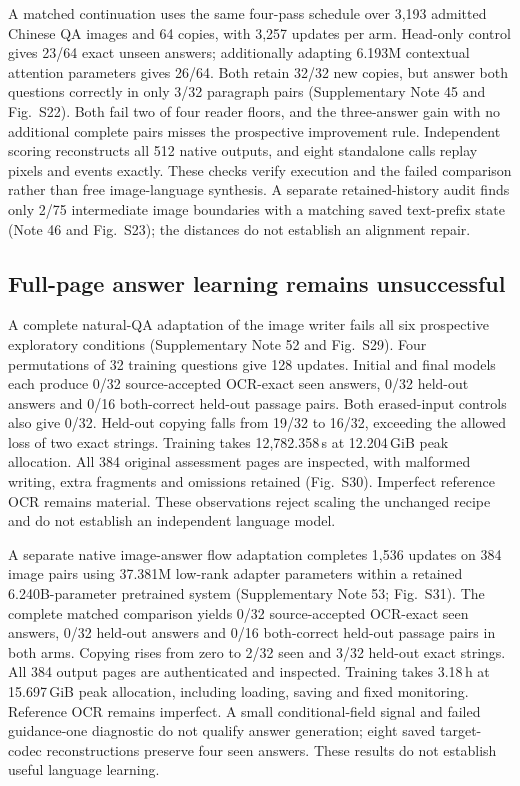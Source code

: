 \documentclass[12pt,a4paper]{article}
\begin{document}
A matched continuation uses the same four-pass schedule over 3,193 admitted
Chinese QA images and 64 copies, with 3,257 updates per arm. Head-only
control gives 23/64 exact unseen answers; additionally adapting 6.193M
contextual attention parameters gives 26/64. Both retain 32/32 new copies,
but answer both questions correctly in only 3/32 paragraph pairs
(Supplementary Note 45 and Fig.~S22). Both fail two of four reader floors,
and the three-answer gain with no additional complete pairs misses the
prospective improvement rule. Independent scoring reconstructs all 512
native outputs, and eight standalone calls replay pixels and events
exactly. These checks verify execution and the failed comparison rather
than free image-language synthesis. A separate retained-history audit
finds only 2/75 intermediate image boundaries with a matching saved
text-prefix state (Note 46 and Fig.~S23); the distances do not establish
an alignment repair.

\subsection*{Full-page answer learning remains unsuccessful}
A complete natural-QA adaptation of the image writer fails all six prospective
exploratory conditions (Supplementary Note 52 and Fig.~S29). Four permutations
of 32 training questions give 128 updates. Initial and final models each
produce 0/32 source-accepted OCR-exact seen answers, 0/32 held-out answers
and 0/16 both-correct held-out passage pairs. Both erased-input controls
also give 0/32. Held-out copying falls from 19/32 to 16/32, exceeding the
allowed loss of two exact strings. Training takes 12,782.358\,s at 12.204\,GiB
peak allocation. All 384 original assessment pages are inspected, with
malformed writing, extra fragments and omissions retained (Fig.~S30).
Imperfect reference OCR remains material. These observations reject scaling
the unchanged recipe and do not establish an independent language model.


A separate native image-answer flow adaptation completes 1,536 updates on
384 image pairs using 37.381M low-rank adapter parameters within a retained
6.240B-parameter pretrained system (Supplementary Note 53; Fig.~S31).
The complete matched comparison yields 0/32 source-accepted OCR-exact seen
answers, 0/32 held-out answers and 0/16 both-correct held-out passage pairs
in both arms. Copying rises from zero to 2/32 seen and 3/32 held-out exact
strings. All 384 output pages are authenticated and inspected. Training takes
3.18\,h at 15.697\,GiB peak allocation, including loading, saving and fixed
monitoring. Reference OCR remains imperfect. A small conditional-field signal
and failed guidance-one diagnostic do not qualify answer generation; eight
saved target-codec reconstructions preserve four seen answers. These results
do not establish useful language learning.
\end{document}
